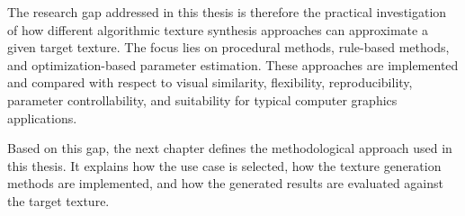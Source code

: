 The research gap addressed in this thesis is therefore the practical investigation of how different algorithmic texture synthesis approaches can approximate a given target texture. The focus lies on procedural methods, rule-based methods, and optimization-based parameter estimation. These approaches are implemented and compared with respect to visual similarity, flexibility, reproducibility, parameter controllability, and suitability for typical computer graphics applications.

Based on this gap, the next chapter defines the methodological approach used in this thesis. It explains how the use case is selected, how the texture generation methods are implemented, and how the generated results are evaluated against the target texture.